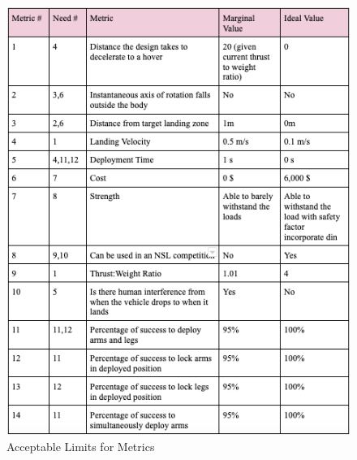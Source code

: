\begin{figure}
    \centering
    \includegraphics[width=1.0\textwidth]{src/figs/metricstable.png}
    \caption{Acceptable Limits for Metrics}
    \label{needs-limits-table}
\end{figure}